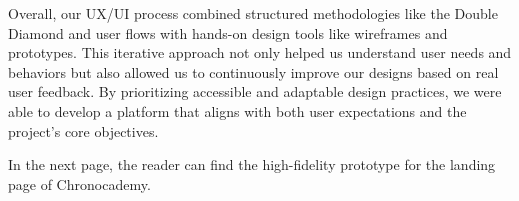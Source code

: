 Overall, our UX/UI process combined structured methodologies like the Double Diamond and user flows with hands-on design tools like wireframes and prototypes.
This iterative approach not only helped us understand user needs and behaviors but also allowed us to continuously improve our designs based on real user feedback.
By prioritizing accessible and adaptable design practices, we were able to develop a platform that aligns with both user expectations and the project’s core objectives.

In the next page, the reader can find the high-fidelity prototype for the landing page of Chronocademy.
